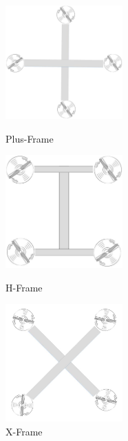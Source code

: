 \begin{figure}[h]
        \centering
        
    \begin{minipage}[t]{0.32\textwidth}
          \centering
            \includegraphics[width = 0.4\textwidth]{VAPIQ-PICTURES/+copter.jpg}
            \caption{Plus-Frame}
            \label{Plus}
    \end{minipage}
            \hfill
    \begin{minipage}[t]{0.32\textwidth}
         \centering
           \includegraphics[width = 0.4\textwidth]{VAPIQ-PICTURES/H-copter.jpg}
            \caption{H-Frame}
            \label{H}
    \end{minipage}
            \hfill
    \begin{minipage}[t]{0.32\textwidth}
         \centering
            \includegraphics[width = 0.4\textwidth]{VAPIQ-PICTURES/X-copter.jpg}
            \caption{X-Frame}
            \label{X}
    \end{minipage}
\end{figure}






